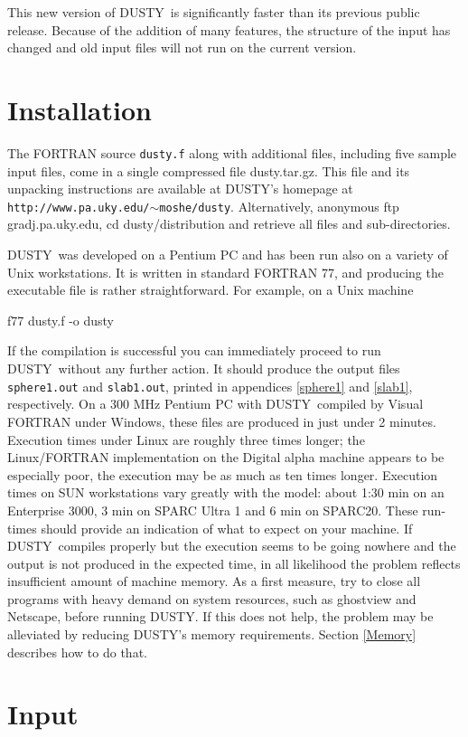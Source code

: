 \documentclass[12pt]{article} \usepackage{epsf}
\def\Section#1{\section{\sc #1}}
\def\D  {{\sf DUSTY}}
\begin{document}
This new version of \D\ is significantly faster than its previous public
release. Because of the addition of many features, the structure of the input
has changed and old input files will not run on the current version.

\Section{Installation}

The FORTRAN source {\tt dusty.f} along with additional files, including five
sample input files, come in a single compressed file dusty.tar.gz. This file
and its unpacking instructions are available at \D's homepage at {\tt
http://www.pa.uky.edu/$\sim$moshe/dusty}. Alternatively, anonymous ftp
gradj.pa.uky.edu, cd dusty/distribution and retrieve all files and
sub-directories.

\D\ was developed on a Pentium PC and has been run also on a variety of Unix
workstations. It is written in standard FORTRAN 77, and producing the
executable file is rather straightforward.  For example, on a Unix machine

\bigskip

  f77 dusty.f -o dusty

\bigskip\noindent If the compilation is successful you can immediately proceed
to run \D\ without any further action. It should produce the output files {\tt
sphere1.out} and {\tt slab1.out}, printed in appendices \ref{sphere1} and
\ref{slab1}, respectively.  On a 300 MHz Pentium PC with \D\ compiled by Visual
FORTRAN under Windows, these files are produced in just under 2 minutes.
Execution times under Linux are roughly three times longer; the Linux/FORTRAN
implementation on the Digital alpha machine appears to be especially poor, the
execution may be as much as ten times longer. Execution times on SUN
workstations vary greatly with the model: about 1:30 min on an Enterprise 3000,
3 min on SPARC Ultra 1 and 6 min on SPARC20. These run-times should provide an
indication of what to expect on your machine. If \D\ compiles properly but the
execution seems to be going nowhere and the output is not produced in the
expected time, in all likelihood the problem reflects insufficient amount of
machine memory. As a first measure, try to close all programs with heavy demand
on system resources, such as ghostview and Netscape, before running \D.  If
this does not help, the problem may be alleviated by reducing \D's memory
requirements. Section \ref{Memory} describes how to do that.


\Section{Input}
\end{document}
